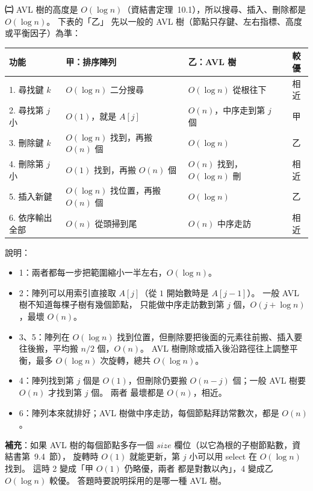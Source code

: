 \begin{pastsoln}
\textbf{㈡} AVL 樹的高度是 $O(\log n)$（資結書定理~10.1），所以搜尋、插入、刪除都是 $O(\log n)$。 下表的「乙」
先以一般的 AVL 樹（節點只存鍵、左右指標、高度或平衡因子）為準：
\begin{center}
\small
\begin{tabular}{lllc}
\toprule
功能 & 甲：排序陣列 & 乙：AVL 樹 & 較優 \\
\midrule
1. 尋找鍵 $k$ & $O(\log n)$ 二分搜尋 & $O(\log n)$ 從根往下 & 相近 \\
2. 尋找第 $j$ 小 & $O(1)$，就是 $A[j]$ & $O(n)$，中序走到第 $j$ 個 & 甲 \\
3. 刪除鍵 $k$ & $O(\log n)$ 找到，再搬 $O(n)$ 個 & $O(\log n)$ & 乙 \\
4. 刪除第 $j$ 小 & $O(1)$ 找到，再搬 $O(n)$ 個 & $O(n)$ 找到，$O(\log n)$ 刪 & 相近 \\
5. 插入新鍵 & $O(\log n)$ 找位置，再搬 $O(n)$ 個 & $O(\log n)$ & 乙 \\
6. 依序輸出全部 & $O(n)$ 從頭掃到尾 & $O(n)$ 中序走訪 & 相近 \\
\bottomrule
\end{tabular}
\end{center}
說明：
\begin{itemize}
\item 1：兩者都每一步把範圍縮小一半左右，$O(\log n)$。
\item 2：陣列可以用索引直接取 $A[j]$（從 $1$ 開始數時是 $A[j - 1]$）。 一般 AVL 樹不知道每棵子樹有幾個節點，
只能做中序走訪數到第 $j$ 個，$O(j + \log n)$，最壞 $O(n)$。
\item 3、5：陣列在 $O(\log n)$ 找到位置，但刪除要把後面的元素往前搬、插入要往後搬，平均搬 $n/2$ 個，$O(n)$。
AVL 樹刪除或插入後沿路徑往上調整平衡，最多 $O(\log n)$ 次旋轉，總共 $O(\log n)$。
\item 4：陣列找到第 $j$ 個是 $O(1)$，但刪除仍要搬 $O(n - j)$ 個；一般 AVL 樹要 $O(n)$ 才找到第 $j$ 個。 兩者
最壞都是 $O(n)$，相近。
\item 6：陣列本來就排好；AVL 樹做中序走訪，每個節點拜訪常數次，都是 $O(n)$。
\end{itemize}
\textbf{補充}：如果 AVL 樹的每個節點多存一個 $\mathit{size}$ 欄位（以它為根的子樹節點數，資結書第~9.4~節），
旋轉時 $O(1)$ 就能更新，第 $j$ 小可以用 select 在 $O(\log n)$ 找到。 這時 2 變成「甲 $O(1)$ 仍略優，兩者
都是對數以內」，4 變成乙 $O(\log n)$ 較優。 答題時要說明採用的是哪一種 AVL 樹。
\end{pastsoln}
